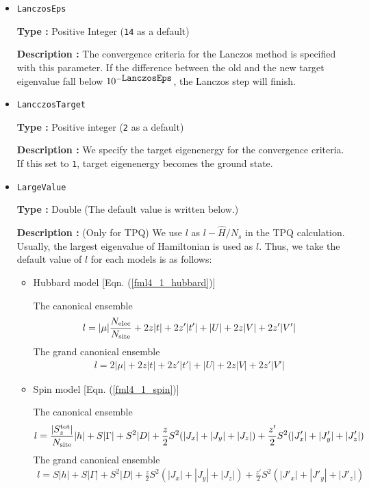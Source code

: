 \begin{itemize}
{\bf Description :}  We specify the number of getting eigenvectors from the ground energy by Lanczos method.\\
When exct=2, we obtain the eigenvector of the first-excited state.

{\bf Note}:  the following condition must be satisfied: \verb|nvec| $>=$ \verb|exct|.

\item \verb|LanczosEps|

{\bf Type :} Positive Integer (\verb|14| as a default)

{\bf Description :} The convergence criteria for the Lanczos method is specified with this parameter.
If the difference between the old and the new target eigenvalue fall below $10^{- \verb|LanczosEps|}$, 
the Lanczos step will finish.

\item \verb|LancczosTarget|

{\bf Type :} Positive integer (\verb|2| as a default)

{\bf Description :} We specify the target eigenenergy for the convergence criteria.
If this set to \verb|1|, target eigenenergy becomes the ground state.

\item \verb|LargeValue|

{\bf Type :} Double (The default value is written below.)

{\bf Description :} (Only for TPQ) 
We use $l$ as $l-\hat{H}/N_{s}$ in the TPQ calculation.
Usually, the largest eigenvalue of Hamiltonian is used as $l$. 
Thus, we take the default value of $l$ for each models is as follows:

\begin{itemize}

\item Hubbard model [Eqn. (\ref{fml4_1_hubbard})]

The canonical ensemble
\begin{align}
l = |\mu| \frac{N_{\rm elec}}{N_{\rm site}}
+ 2 z |t| + 2 z' |t'| + |U| + 2 z |V| + 2 z' |V'| 
\end{align}
The grand canonical ensemble
\begin{align}
l = 2|\mu|
+ 2 z |t| + 2 z' |t'| + |U| + 2 z |V| + 2 z' |V'|
\end{align}

\item Spin model [Eqn. (\ref{fml4_1_spin})]

The canonical ensemble
\begin{align}
l = \frac{|S_z^{\rm tot}|}{N_{\rm site}}|h| + S |\Gamma| + S^2 |D|
+\frac{z}{2} S^2 (|J_x|+|J_y|+|J_z|) +\frac{z'}{2} S^2 (|J'_x|+|J'_y|+|J'_z|)
\end{align}
The grand canonical ensemble
\begin{align}
l = S |h| + S |\Gamma| + S^2 |D|
+\frac{z}{2} S^2 (|J_x|+|J_y|+|J_z|) + \frac{z'}{2} S^2 (|J'_x|+|J'_y|+|J'_z|) 
\end{align}


\end{itemize}
\end{itemize}
